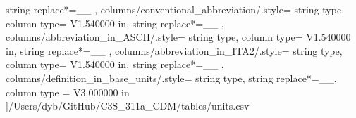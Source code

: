 \begin{landscape}
{            string replace*={_}{\_}
        },
    columns/conventional_abbreviation/.style={
            string type, 
            column type= V{1.540000 in}, 
            string replace*={_}{\_}
        },
    columns/abbreviation_in_ASCII/.style={
            string type, 
            column type= V{1.540000 in}, 
            string replace*={_}{\_}
        },
    columns/abbreviation_in_ITA2/.style={
            string type, 
            column type= V{1.540000 in}, 
            string replace*={_}{\_}
        },
    columns/definition_in_base_units/.style={
            string type, 
            string replace*={_}{\_},
            column type = V{3.000000 in}
        }
    ]{/Users/dyb/GitHub/C3S_311a_CDM/tables/units.csv}
\end{landscape}
